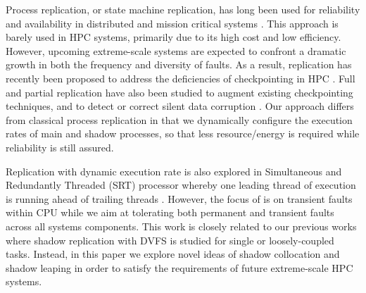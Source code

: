 Process replication, or state machine replication, has long been used for reliability and availability in distributed and mission critical systems \cite{schneider_1990_tutorial}. %
This approach is barely used in HPC systems, primarily due to its high cost and low efficiency.
However, upcoming extreme-scale systems are expected to 
confront a dramatic growth in both the frequency and diversity of faults.
As a result,
replication has recently been proposed to address the deficiencies of checkpointing in HPC \cite{Cappello:09:Fault,engelmann2011redundant}. 
Full and partial
replication have also been studied to augment existing checkpointing techniques, and to  
detect or correct silent data corruption \cite{stearly_2012_partial,elliott_2012_cpr,ferreira_sc_2011,fiala_2012_sdc}. %
Our approach differs from classical process replication in that we dynamically configure the execution rates of main and shadow processes, so that less resource/energy is required while reliability is still assured.  


Replication with dynamic execution rate is also explored in Simultaneous and Redundantly Threaded (SRT) processor whereby one leading thread of execution is running ahead of trailing threads \cite{reinhardt2000transient}. However, 
the focus of \cite{reinhardt2000transient} is on transient faults within CPU while we aim at tolerating both permanent and transient faults across all systems components.
This work is closely related to our previous works \cite{mills_2014_icnc,cui_en7085151,cui_2014_closer} where shadow replication with DVFS is studied for single or loosely-coupled tasks. Instead, in this paper we explore novel ideas of shadow collocation and shadow leaping in order to satisfy the requirements of future extreme-scale HPC systems. 
